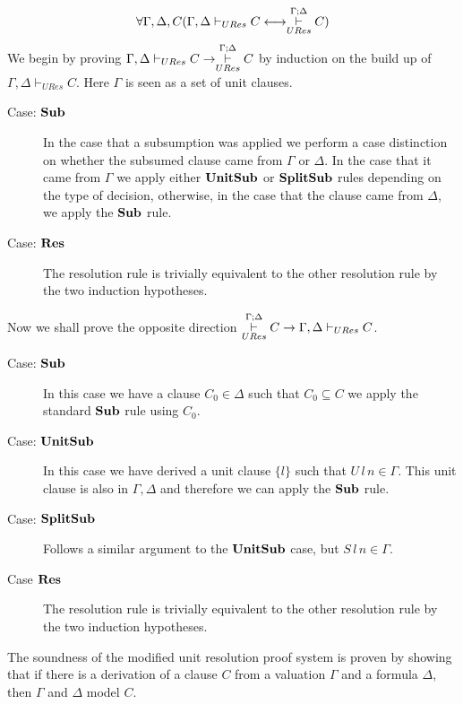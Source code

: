 \medskip
\begin{mytheorem}
\begin{align*}
\forall \Gamma,\Delta,C ( \Gamma,\Delta \vdash_{URes} C  \longleftrightarrow   \overset{\Gamma;\Delta}{\underset{URes}{\vdash}} C )
\end{align*}
 We begin by proving $\Gamma,\Delta \vdash_{URes} C  \to   \overset{\Gamma;\Delta}{\underset{URes}{\vdash}} C$ by induction on the build up of $\Gamma, \Delta \vdash_{URes} C$. Here $\Gamma$ is seen as a set of unit clauses.
\begin{description}

\item[Case: $\mathbf{Sub}$]
In the case that a subsumption was applied we perform a case distinction on whether the subsumed clause came from $\Gamma$ or $\Delta$. In the case that it came from $\Gamma$ we apply either $\mathbf{UnitSub}$ or $\mathbf{SplitSub}$ rules depending on the type of decision, otherwise, in the case that the clause came from $\Delta$, we apply the $\mathbf{Sub}$ rule.
\item[Case: $\mathbf{Res}$]
The resolution rule is trivially equivalent to the other resolution rule by the two induction hypotheses.
\end{description}
Now we shall prove the opposite direction   $\overset{\Gamma;\Delta}{\underset{URes}{\vdash}} C \to \Gamma,\Delta \vdash_{URes} C $.
\begin{description}
\item[Case: $\mathbf{Sub}$]
In this case we have a clause $C_0 \in \Delta$ such that $C_0 \subseteq C$ we apply the standard $\mathbf{Sub}$ rule using $C_0$.
\item[Case: $\mathbf{UnitSub}$]
In this case we have derived a unit clause $\{ l \}$ such that $U \, l \, n \in \Gamma$. This unit clause is also in $\Gamma,\Delta$ and therefore we can apply the  $\mathbf{Sub}$ rule.
\item[Case: $\mathbf{SplitSub}$] 
Follows a similar argument to the $\mathbf{UnitSub}$ case, but $S \, l \, n \in \Gamma$.
\item[Case $\mathbf{Res}$]
The resolution rule is trivially equivalent to the other resolution rule by the two induction hypotheses.
\end{description}

\end{mytheorem}
\medskip
The soundness of the modified unit resolution proof system is proven by showing that if there is a derivation of a clause $C$ from a valuation $\Gamma$ and a formula $\Delta$, then $\Gamma$ and $\Delta$ model $C$. \\
